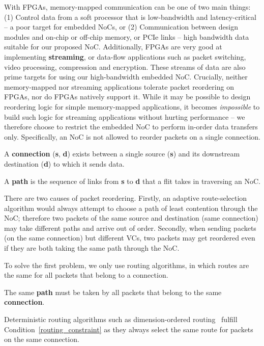 With FPGAs, memory-mapped communication can be one of two main things: (1) Control data from a soft processor that is low-bandwidth and latency-critical -- a poor target for embedded NoCs, or (2) Communication between design modules and on-chip or off-chip memory, or PCIe links -- high bandwidth data suitable for our proposed NoC.
Additionally, FPGAs are very good at implementing \textbf{streaming}, or data-flow applications such as packet switching, video processing, compression and encryption.
These streams of data are also prime targets for using our high-bandwidth embedded NoC.
Crucially, neither memory-mapped nor streaming applications tolerate packet reordering on FPGAs, nor do FPGAs natively support it.
While it may be possible to design reordering logic for simple memory-mapped applications, it becomes \textit{impossible} to build such logic for streaming applications without hurting performance -- we therefore choose to restrict the embedded NoC to perform in-order data transfers only.
Specifically, an NoC is not allowed to reorder packets on a single connection.
%
\begin{defn}
A \textbf{connection} (\textbf{s}, \textbf{d}) exists between a single source (\textbf{s}) and its downstream destination (\textbf{d}) to which it sends data.
\end{defn}
%
\begin{defn}
A \textbf{path} is the sequence of links from \textbf{s} to \textbf{d} that a flit takes in traversing an NoC.
\end{defn}
%

There are two causes of packet reordering.
Firstly, an adaptive route-selection algorithm would always attempt to choose a path of least contention through the NoC; therefore two packets of the same source and destination (same connection) may take different paths and arrive out of order.
Secondly, when sending packets (on the same connection) but different VCs, two packets may get reordered even if they are both taking the same path through the NoC.

To solve the first problem, we only use routing algorithms, in which routes are the same for all packets that belong to a connection.
%
\begin{cond}
\label{routing_constraint}
The same \textbf{path} must be taken by all packets that belong to the same \textbf{connection}.
\end{cond}
%
%
Deterministic routing algorithms such as dimension-ordered routing~\cite{dally_book} fulfill Condition~\ref{routing_constraint} as they always select the same route for packets on the same connection.
%



